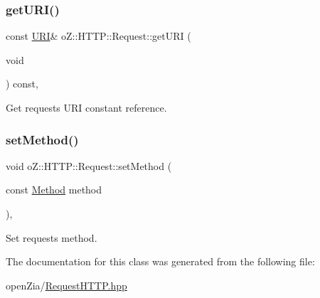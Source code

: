 \mbox{\label{classo_z_1_1_h_t_t_p_1_1_request_afe1db07c464e1b708187108cbef952fa}} 
\subsubsection{\texorpdfstring{getURI()}{getURI()}\hspace{0.1cm}{\footnotesize\ttfamily [2/2]}}
{\footnotesize\ttfamily const \mbox{\hyperlink{namespaceo_z_1_1_h_t_t_p_a6d47156e2eac27750983fc1b54bd2ff8}{U\+RI}}\& o\+Z\+::\+H\+T\+T\+P\+::\+Request\+::get\+U\+RI (\begin{DoxyParamCaption}\item[{void}]{ }\end{DoxyParamCaption}) const\hspace{0.3cm}{\ttfamily [inline]}, {\ttfamily [noexcept]}}



Get request\textquotesingle{}s U\+RI constant reference. 

\mbox{\label{classo_z_1_1_h_t_t_p_1_1_request_ad38f30d48f4d3f201380ac1e73b26fc8}} 
\subsubsection{\texorpdfstring{setMethod()}{setMethod()}}
{\footnotesize\ttfamily void o\+Z\+::\+H\+T\+T\+P\+::\+Request\+::set\+Method (\begin{DoxyParamCaption}\item[{const \mbox{\hyperlink{namespaceo_z_1_1_h_t_t_p_a02d8497e4abbb0adf3af0fe9fad1b7a6}{Method}}}]{method }\end{DoxyParamCaption})\hspace{0.3cm}{\ttfamily [inline]}, {\ttfamily [noexcept]}}



Set request\textquotesingle{}s method. 



The documentation for this class was generated from the following file\+:\begin{DoxyCompactItemize}
\item 
open\+Zia/\mbox{\hyperlink{_request_h_t_t_p_8hpp}{Request\+H\+T\+T\+P.\+hpp}}\end{DoxyCompactItemize}
